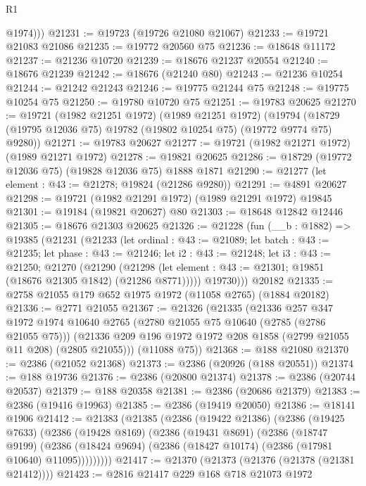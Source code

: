 \begin{lexlean}{R1}
\begin{coremodule}
          @1974)))
@21231 := @19723 (@19726 @21080 @21067)
@21233 := @19721 @21083 @21086
@21235 := @19772 @20560 @75
@21236 := @18648 @11172
@21237 := @21236 @10720
@21239 := @18676 @21237 @20554
@21240 := @18676 @21239
@21242 := @18676 (@21240 @80)
@21243 := @21236 @10254
@21244 := @21242 @21243
@21246 := @19775 @21244 @75
@21248 := @19775 @10254 @75
@21250 := @19780 @10720 @75
@21251 := @19783 @20625
@21270 := @19721
    (@1982 @21251 @1972)
    (@1989 @21251 @1972)
    (@19794 (@18729 (@19795 @12036 @75) @19782 (@19802 @10254 @75) (@19772 @9774 @75) @9280))
@21271 := @19783 @20627
@21277 := @19721 (@1982 @21271 @1972) (@1989 @21271 @1972)
@21278 := @19821 @20625
@21286 := @18729 (@19772 @12036 @75) (@19828 @12036 @75) @1888 @1871
@21290 := @21277 (let element : @43 := @21278; @19824 (@21286 @9280))
@21291 := @4891 @20627
@21298 := @19721 (@1982 @21291 @1972) (@1989 @21291 @1972) @19845
@21301 := @19184 (@19821 @20627) @80
@21303 := @18648 @12842 @12446
@21305 := @18676 @21303 @20625
@21326 := @21228
    (fun (__b : @1882) =>
    @19385
      (@21231
        (@21233
          (let ordinal : @43 := @21089;
          let batch : @43 := @21235;
          let phase : @43 := @21246;
          let i2 : @43 := @21248;
          let i3 : @43 := @21250;
          @21270
            (@21290
              (@21298 (let element : @43 := @21301; @19851 (@18676 @21305 @1842) (@21286 @8771)))))
          @19730)))
    @20182
@21335 := @2758 @21055 @179 @652 @1975 @1972 (@11058 @2765) (@1884 @20182)
@21336 := @2771 @21055
@21367 := @21326
    (@21335
      (@21336
        @257
        @347
        @1972
        @1974
        @10640
        @2765
        (@2780 @21055 @75 @10640 (@2785 (@2786 @21055 @75)))
        (@21336 @209 @196 @1972 @1972 @208 @1858 (@2799 @21055 @11 @208) (@2805 @21055)))
      (@11088 @75))
@21368 := @188 @21080
@21370 := @2386 (@21052 @21368)
@21373 := @2386 (@20926 (@188 @20551))
@21374 := @188 @19736
@21376 := @2386 (@20800 @21374)
@21378 := @2386 (@20744 @20537)
@21379 := @188 @20358
@21381 := @2386 (@20686 @21379)
@21383 := @2386 (@19416 @19963)
@21385 := @2386 (@19419 @20050)
@21386 := @18141 @1906
@21412 := @21383
    (@21385
      (@2386
        (@19422 @21386)
        (@2386
          (@19425 @7633)
          (@2386
            (@19428 @8169)
            (@2386
              (@19431 @8691)
              (@2386
                (@18747 @9199)
                (@2386 (@18424 @9694) (@2386 (@18427 @10174) (@2386 (@17981 @10640) @11095)))))))))
@21417 := @21370 (@21373 (@21376 (@21378 (@21381 @21412))))
@21423 := @2816 @21417 @229 @168 @718 @21073 @1972

\end{coremodule}
\end{lexlean}
